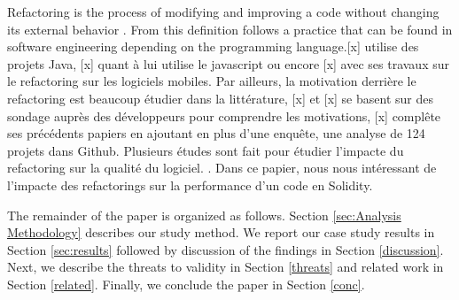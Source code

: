 \label{sec:introduction}



Refactoring is the process of modifying and improving a code without changing its external behavior \cite{fowler2018refactoring} \cite{silva2016we} \cite{opdyke1992refactoring}. From this definition follows a practice that can be found in software engineering depending on the programming language.[x] utilise des projets Java, [x] quant à lui utilise le javascript ou encore [x] avec ses travaux sur le refactoring sur les logiciels mobiles. Par ailleurs, la motivation derrière le refactoring est beaucoup étudier dans la littérature, [x] et [x] se basent sur des sondage auprès des développeurs pour comprendre les motivations, [x] complête ses précédents papiers en ajoutant en plus d'une enquête, une analyse de 124 projets dans Github. Plusieurs études sont fait pour étudier l'impacte du refactoring sur la qualité du logiciel. .
Dans ce papier, nous nous intéressant de l'impacte des refactorings sur la performance d'un code en Solidity. 

The remainder of the paper is organized as follows. Section \ref{sec:Analysis Methodology} describes our study method. We report our case study results in Section \ref{sec:results} followed by discussion of the findings in Section \ref{discussion}. Next, we describe the threats to validity in Section \ref{threats} and related work in Section \ref{related}. Finally, we conclude the paper in Section \ref{conc}. 


